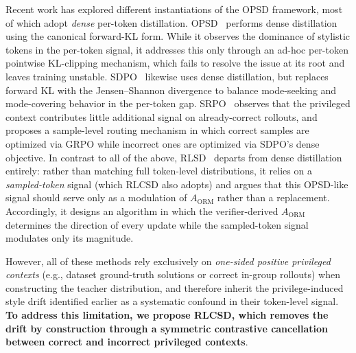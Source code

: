 Recent work has explored different instantiations of the OPSD framework, most of which adopt \emph{dense} per-token distillation. OPSD~\citep{zhao2026self} performs dense distillation using the canonical forward-KL form. While it observes the dominance of stylistic tokens in the per-token signal, it addresses this only through an ad-hoc per-token pointwise KL-clipping mechanism, which fails to resolve the issue at its root and leaves training unstable. SDPO~\citep{hubotter2026reinforcement} likewise uses dense distillation, but replaces forward KL with the Jensen--Shannon divergence to balance mode-seeking and mode-covering behavior in the per-token gap. SRPO~\citep{li2026unifying} observes that the privileged context contributes little additional signal on already-correct rollouts, and proposes a sample-level routing mechanism in which correct samples are optimized via GRPO while incorrect ones are optimized via SDPO's dense objective. In contrast to all of the above, RLSD~\citep{yang2026self} departs from dense distillation entirely: rather than matching full token-level distributions, it relies on a \emph{sampled-token} signal (which RLCSD also adopts) and argues that this OPSD-like signal should serve only as a modulation of $A_{\text{ORM}}$ rather than a replacement. Accordingly, it designs an algorithm in which the verifier-derived $A_{\text{ORM}}$ determines the direction of every update while the sampled-token signal modulates only its magnitude.

However, all of these methods rely exclusively on \emph{one-sided positive privileged contexts} (e.g., dataset ground-truth solutions or correct in-group rollouts) when constructing the teacher distribution, and therefore inherit the privilege-induced style drift identified earlier as a systematic confound in their token-level signal. \textbf{To address this limitation, we propose RLCSD, which removes the drift by construction through a symmetric contrastive cancellation between correct and incorrect privileged contexts}.



